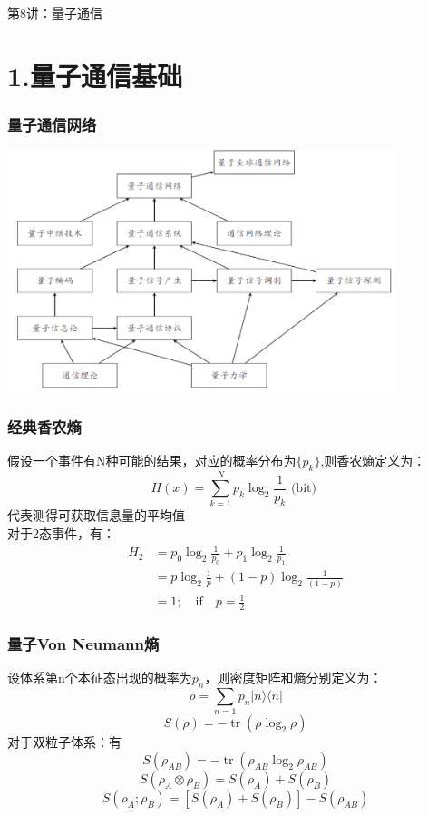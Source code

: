 

\begin{frame} [plain]
    \frametitle{}
    \Background[1] 
    \begin{center}
    {\huge 第8讲：量子通信 }
    \end{center}  
    \addtocounter{framenumber}{-1}   
\end{frame}

\section{1.量子通信基础}
\begin{frame}
    \frametitle{量子通信网络}
    \begin{center}
        \includegraphics[width=0.85\textwidth]{figs/40.png}
    \end{center}
\end{frame}

\begin{frame}
    \frametitle{经典香农熵}
    假设一个事件有N种可能的结果，对应的概率分布为$\{p_k\}$,则香农熵定义为：
    \[H(x)=\sum_{k=1}^{N} p_{k} \log _{2} \frac{1}{p_{k}} \text { (bit) }\]
    代表测得可获取信息量的平均值\\
    对于2态事件，有：
    \[\begin{aligned} H_{2} &=p_{0} \log _{2} \frac{1}{p_{0}}+p_{1} \log _{2} \frac{1}{p_{1}} \\ 
        &=p \log _{2} \frac{1}{p}+(1-p) \log _{2} \frac{1}{(1-p)} \\
        &=1; \quad \text{if} \quad p=\frac{1}{2}
     \end{aligned}\]   
\end{frame}

\begin{frame}
    \frametitle{量子Von Neumann熵}
    设体系第n个本征态出现的概率为$p_n$，则密度矩阵和熵分别定义为：
    \[\rho=\sum_{n=1} p_{n}|n\rangle\langle n| \]
    \[S(\rho)=-\operatorname{tr}\left(\rho \log _{2} \rho\right)\]
    对于双粒子体系：有
    \[S\left(\rho_{A B}\right)=-\operatorname{tr}\left(\rho_{A B} \log _{2} \rho_{A B}\right)\]
    \[S\left(\rho_{A} \otimes \rho_{B}\right)=S\left(\rho_{A}\right)+S\left(\rho_{B}\right)\]
    \[S\left(\rho_{A} ; \rho_{B}\right)=\left[S\left(\rho_{A}\right)+S\left(\rho_{B}\right)\right]-S\left(\rho_{A B}\right)\]
\end{frame}

